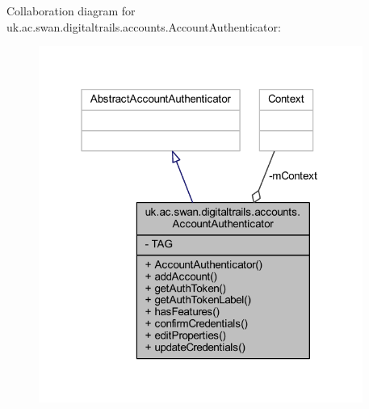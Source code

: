 Collaboration diagram for uk.\+ac.\+swan.\+digitaltrails.\+accounts.\+Account\+Authenticator\+:
\nopagebreak
\begin{figure}[H]
\begin{center}
\leavevmode
\includegraphics[width=301pt]{classuk_1_1ac_1_1swan_1_1digitaltrails_1_1accounts_1_1_account_authenticator__coll__graph}
\end{center}
\end{figure}
